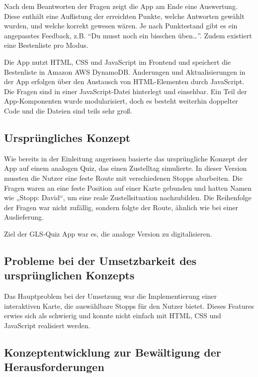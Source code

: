 \documentclass[biblatex]{lni}
\begin{document}
Nach dem Beantworten der Fragen zeigt die App am Ende eine Auswertung.
Diese enthält eine Auflistung der erreichten Punkte, welche Antworten gewählt wurden, und welche korrekt gewesen wären.
Je nach Punktestand gibt es ein angepasstes Feedback, z.B. “Du musst noch ein bisschen üben…”.
Zudem existiert eine Bestenliste pro Modus.

Die App nutzt HTML, CSS und JavaScript im Frontend und speichert die Bestenliste in Amazon AWS DynamoDB.
Änderungen und Aktualisierungen in der App erfolgen über den Austausch von HTML-Elementen durch JavaScript.
Die Fragen sind in einer JavaScript-Datei hinterlegt und einsehbar.
Ein Teil der App-Komponenten wurde modularisiert,
doch es besteht weiterhin doppelter Code und die Dateien sind teils sehr groß.

\subsection{Ursprüngliches Konzept}

Wie bereits in der Einleitung angerissen basierte das ursprüngliche Konzept der App auf einem analogen Quiz,
das einen Zustelltag simulierte.
In dieser Version mussten die Nutzer eine feste Route mit verschiedenen Stopps abarbeiten.
Die Fragen waren an eine feste Position auf einer Karte gebunden und hatten Namen wie „Stopp: David“,
um eine reale Zustellsituation nachzubilden.
Die Reihenfolge der Fragen war nicht zufällig, sondern folgte der Route, ähnlich wie bei einer Auslieferung.

Ziel der GLS-Quiz App war es, die analoge Version zu digitalisieren.

\subsection{Probleme bei der Umsetzbarkeit des ursprünglichen Konzepts}

Das Hauptproblem bei der Umsetzung war die Implementierung einer interaktiven Karte,
die auswählbare Stopps für den Nutzer bietet.
Dieses Features erwies sich als schwierig und konnte nicht einfach mit HTML, CSS und JavaScript realisiert werden.

\subsection{Konzeptentwicklung zur Bewältigung der Herausforderungen}
\end{document}
